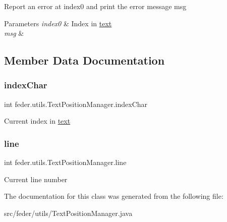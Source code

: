 Report an error at \textquotesingle{}index0\textquotesingle{} and print the error message \textquotesingle{}msg\textquotesingle{} 
\begin{DoxyParams}{Parameters}
{\em index0} & Index in \hyperlink{}{text } \\
\hline
{\em msg} & \\
\hline
\end{DoxyParams}


\subsection{Member Data Documentation}
\mbox{\label{classfeder_1_1utils_1_1TextPositionManager_a3210bdef9fb20fe3f3ce274a93570f9c}} 
\subsubsection{\texorpdfstring{index\+Char}{indexChar}}
{\footnotesize\ttfamily int feder.\+utils.\+Text\+Position\+Manager.\+index\+Char}

Current index in \hyperlink{}{text  }\mbox{\label{classfeder_1_1utils_1_1TextPositionManager_adf4d8e39cd4d86526eebcce2f467bb9c}} 
\subsubsection{\texorpdfstring{line}{line}}
{\footnotesize\ttfamily int feder.\+utils.\+Text\+Position\+Manager.\+line}

Current line number 

The documentation for this class was generated from the following file\+:\begin{DoxyCompactItemize}
\item 
src/feder/utils/Text\+Position\+Manager.\+java\end{DoxyCompactItemize}
